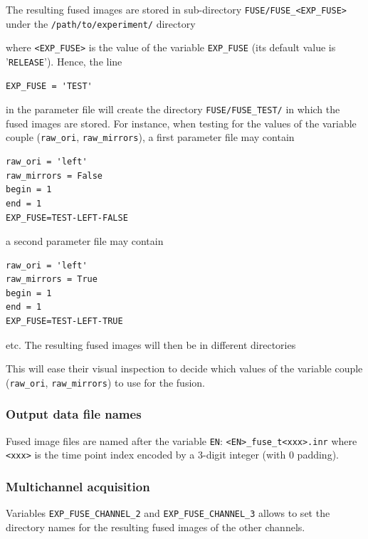 The resulting fused images are stored in sub-directory
\texttt{FUSE/FUSE\_<EXP\_FUSE>} under the
\texttt{/path/to/experiment/} directory 

\mbox{}
\mbox{}

where \texttt{<EXP\_FUSE>} is the value of the variable \texttt{EXP\_FUSE} (its
default value is '\texttt{RELEASE}'). Hence, the line
\begin{verbatim}
EXP_FUSE = 'TEST'
\end{verbatim}
in the parameter file will create the directory
\texttt{FUSE/FUSE\_TEST/} in which the fused images are stored. For
instance, when testing for the values of the variable couple
(\texttt{raw\_ori}, \texttt{raw\_mirrors}), a first parameter file may
contain
\begin{verbatim}
raw_ori = 'left'
raw_mirrors = False
begin = 1
end = 1
EXP_FUSE=TEST-LEFT-FALSE
\end{verbatim}
a second parameter file may
contain
\begin{verbatim}
raw_ori = 'left'
raw_mirrors = True
begin = 1
end = 1
EXP_FUSE=TEST-LEFT-TRUE
\end{verbatim}
etc. The resulting fused images will then be in different directories

\mbox{}
\mbox{}

This will ease their visual inspection to decide which values of the variable couple
(\texttt{raw\_ori}, \texttt{raw\_mirrors}) to use for the fusion.

\subsubsection{Output data file names}

Fused image files are named after the variable \texttt{EN}:
\texttt{<EN>\_fuse\_t<xxx>.inr} where \texttt{<xxx>} is the time point
index encoded by a 3-digit integer (with 0 padding).


\subsubsection{Multichannel acquisition}

Variables \texttt{EXP\_FUSE\_CHANNEL\_2} and
\texttt{EXP\_FUSE\_CHANNEL\_3} allows to set the directory names for
the resulting fused images of the other channels.

